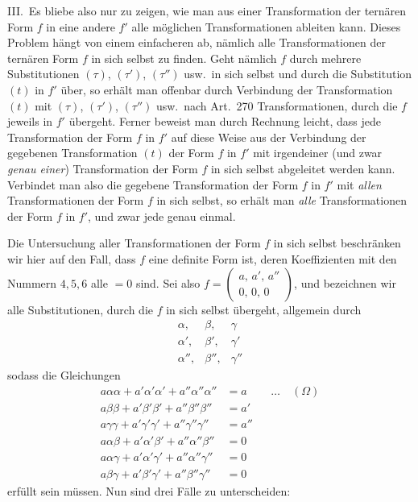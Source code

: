 III.\ Es bliebe also nur zu zeigen, wie man aus einer Transformation
der ternären Form $f$ in eine andere $f'$ alle möglichen
Transformationen ableiten kann. Dieses Problem hängt von einem einfacheren
ab, nämlich alle Transformationen der ternären Form $f$ in sich selbst
zu finden. Geht nämlich $f$ durch mehrere Substitutionen $(\tau)$,
$(\tau')$, $(\tau'')$ usw.\ in sich selbst und durch die Substitution $(t)$
in $f'$ über, so erhält man offenbar durch Verbindung der Transformation
$(t)$ mit $(\tau)$, $(\tau')$, $(\tau'')$ usw.\ nach Art.\ 270 Transformationen,
durch die $f$ jeweils in $f'$ übergeht. Ferner beweist man durch
Rechnung leicht, dass jede Transformation der Form $f$ in $f'$
auf diese Weise aus der Verbindung der gegebenen Transformation $(t)$
der Form $f$ in $f'$ mit irgendeiner (und zwar
\textit{genau einer}) Transformation der Form $f$ in sich selbst
abgeleitet werden kann. Verbindet man also die gegebene Transformation
der Form $f$ in $f'$ mit \textit{allen} Transformationen der Form
$f$ in sich selbst, so erhält man \textit{alle} Transformationen der
Form $f$ in $f'$, und zwar jede genau einmal.

Die Untersuchung aller Transformationen der Form $f$ in sich selbst
beschränken wir hier auf den Fall, dass $f$ eine definite Form ist,
deren Koeffizienten mit den Nummern $4,5,6$ alle $=0$ sind.
Sei also $f=\left(\begin{smallmatrix}a,\,a',\,a''\\0,\,0,\,0\end{smallmatrix}\right)$, und bezeichnen wir alle Substitutionen, durch die
$f$ in sich selbst übergeht, allgemein durch
\[
\begin{array}{ccc}
\alpha,&\beta,&\gamma\\
\alpha',&\beta',&\gamma'\\
\alpha'',&\beta'',&\gamma''
\end{array}
\]
sodass die Gleichungen
\[
\begin{aligned}
a\alpha\alpha+a'\alpha'\alpha'+a''\alpha''\alpha''&=a&&\ldots\quad(\Omega)\\
a\beta\beta+a'\beta'\beta'+a''\beta''\beta''&=a'\\
a\gamma\gamma+a'\gamma'\gamma'+a''\gamma''\gamma''&=a''\\
a\alpha\beta+a'\alpha'\beta'+a''\alpha''\beta''&=0\\
a\alpha\gamma+a'\alpha'\gamma'+a''\alpha''\gamma''&=0\\
a\beta\gamma+a'\beta'\gamma'+a''\beta''\gamma''&=0
\end{aligned}
\]
erfüllt sein müssen. Nun sind drei Fälle zu unterscheiden:

